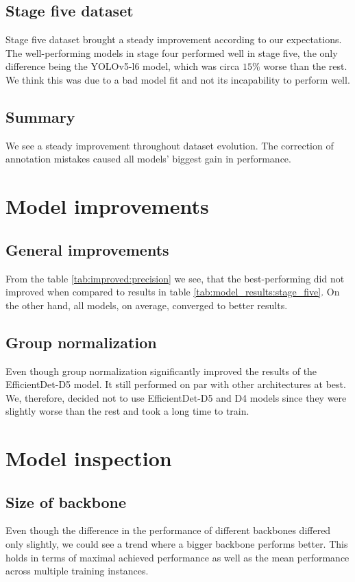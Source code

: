 \subsection{Stage five dataset}

Stage five dataset brought a steady improvement according to our expectations. The well-performing models in stage four performed well in stage five, the only difference being the YOLOv5-l6 model, which was circa $15\%$ worse than the rest. We think this was due to a bad model fit and not its incapability to perform well.

\subsection{Summary}
We see a steady improvement throughout dataset evolution. The correction of annotation mistakes caused all models' biggest gain in performance.

\section{Model improvements}
\subsection{General improvements}
From the table \ref{tab:improved:precision} we see, that the best-performing did not improved when compared to results in table \ref{tab:model_results:stage_five}. On the other hand, all models, on average, converged to better results.

\subsection{Group normalization}
Even though group normalization significantly improved the results of the EfficientDet-D5 model. It still performed on par with other architectures at best. We, therefore, decided not to use EfficientDet-D5 and D4 models since they were slightly worse than the rest and took a long time to train.

\section{Model inspection}
\subsection{Size of backbone}
Even though the difference in the performance of different backbones differed only slightly, we could see a trend where a bigger backbone performs better. This holds in terms of maximal achieved performance as well as the mean performance across multiple training instances.

